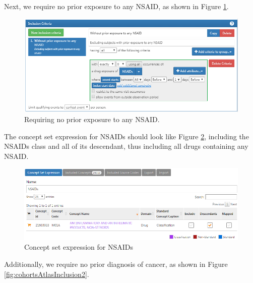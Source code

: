 \documentclass[11pt]{book}
\theoremstyle{definition}
\theoremstyle{definition}
\theoremstyle{definition}
\theoremstyle{remark}
\begin{document}
Next, we require no prior exposure to any NSAID, as shown in Figure \ref{fig:cohortsAtlasInclusion1}.

\begin{figure}

{\centering \includegraphics[width=1\linewidth]{images/SuggestedAnswers/cohortsAtlasInclusion1} 

}

\caption{Requiring no prior exposure to any NSAID.}\label{fig:cohortsAtlasInclusion1}
\end{figure}

The concept set expression for NSAIDs should look like Figure \ref{fig:cohortsAtlasConceptSet2}, including the NSAIDs class and all of its descendant, thus including all drugs containing any NSAID.

\begin{figure}

{\centering \includegraphics[width=1\linewidth]{images/SuggestedAnswers/cohortsAtlasConceptSet2} 

}

\caption{Concept set expression for NSAIDs}\label{fig:cohortsAtlasConceptSet2}
\end{figure}

Additionally, we require no prior diagnosis of cancer, as shown in Figure \ref{fig:cohortsAtlasInclusion2}.
\end{document}
